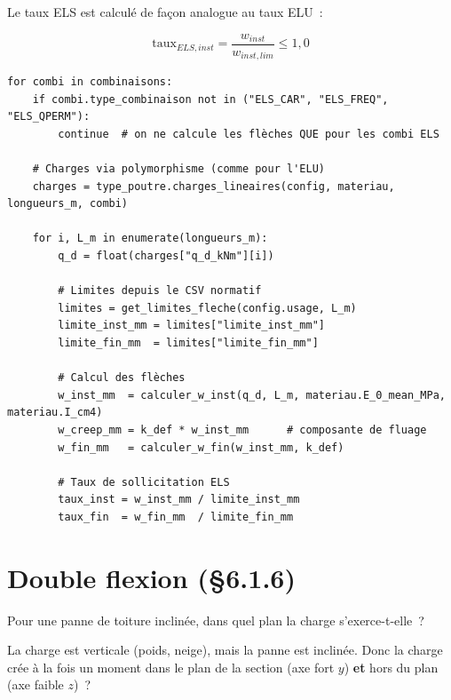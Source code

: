 \documentclass[12pt, a4paper, openany]{book}
\newcommand{\fichier}[1]{\texttt{\textit{#1}}}
\begin{document}
Le taux ELS est calcul\'e de fa\c{c}on analogue au taux ELU~:

\begin{equation}
\text{taux}_{ELS,inst} = \frac{w_{inst}}{w_{inst,lim}}
\leq 1{,}0
\end{equation}

\begin{lstlisting}[style=python, caption={Extrait de \fichier{ec5/els.py} --- boucle de vérification ELS}]
for combi in combinaisons:
    if combi.type_combinaison not in ("ELS_CAR", "ELS_FREQ", "ELS_QPERM"):
        continue  # on ne calcule les flèches QUE pour les combi ELS

    # Charges via polymorphisme (comme pour l'ELU)
    charges = type_poutre.charges_lineaires(config, materiau, longueurs_m, combi)

    for i, L_m in enumerate(longueurs_m):
        q_d = float(charges["q_d_kNm"][i])

        # Limites depuis le CSV normatif
        limites = get_limites_fleche(config.usage, L_m)
        limite_inst_mm = limites["limite_inst_mm"]
        limite_fin_mm  = limites["limite_fin_mm"]

        # Calcul des flèches
        w_inst_mm  = calculer_w_inst(q_d, L_m, materiau.E_0_mean_MPa, materiau.I_cm4)
        w_creep_mm = k_def * w_inst_mm      # composante de fluage
        w_fin_mm   = calculer_w_fin(w_inst_mm, k_def)

        # Taux de sollicitation ELS
        taux_inst = w_inst_mm / limite_inst_mm
        taux_fin  = w_fin_mm  / limite_fin_mm
\end{lstlisting}

\section{Double flexion (\S{}6.1.6)}

\begin{maitre}
Pour une panne de toiture inclin\'ee, dans quel plan la charge
s'exerce-t-elle~?
\end{maitre}

\begin{apprenti}
La charge est verticale (poids, neige), mais la panne est inclin\'ee.
Donc la charge cr\'ee \`a la fois un moment dans le plan de la section
(axe fort $y$) \textbf{et} hors du plan (axe faible $z$)~?
\end{apprenti}
\end{document}

